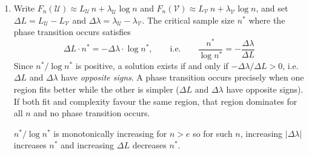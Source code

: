 \documentclass[11pt]{article}
\newcommand{\U}{\mathcal{U}}
\newcommand{\V}{\mathcal{V}}
\begin{document}
\begin{solution}
\begin{enumerate}
    \item
        Write $F_n(\U) \approx L_\U \, n + \lambda_\U \log n$ and
        $F_n(\V) \approx L_\V \, n + \lambda_\V \log n$, and set
        $\Delta L = L_\U - L_\V$ and
        $\Delta\lambda = \lambda_\U - \lambda_\V$. The critical sample
        size $n^*$ where the phase transition occurs satisfies
        \[
            \Delta L \cdot n^* = -\Delta\lambda \cdot \log n^*,
            \qquad\text{i.e.}\qquad
            \frac{n^*}{\log n^*} = -\frac{\Delta\lambda}{\Delta L}
        \]
        Since $n^*/\log n^*$ is positive, a solution exists if
        and only if $-\Delta\lambda / \Delta L > 0$, i.e.\ $\Delta L$
        and $\Delta\lambda$ have \emph{opposite signs}. A phase transition occurs precisely when one region fits better
        while the other is simpler ($\Delta L$ and $\Delta\lambda$ have
        opposite signs). If both fit and complexity favour the same
        region, that region dominates for all $n$ and no phase transition
        occurs.

        $n^*/\log n^*$ is monotonically increasing for $n > e$ so for such $n$, increasing $|\Delta \lambda|$ increases $n^*$ and increasing $\Delta L$ decreases $n^*$.
        
        \qedhere
\end{enumerate}
\end{solution}
\end{document}
